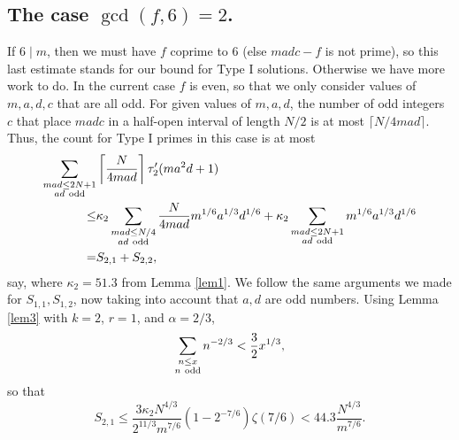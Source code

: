 \documentclass[12pt]{amsart}
\theoremstyle{definition}
\theoremstyle{remark}
\numberwithin{equation}{section}
\begin{document}
\subsection{The case $\gcd(f,6)=2$.}
If $6\mid m$, then we must have $f$ coprime to 6 (else $madc-f$ is not prime),
so this last estimate stands for our bound for Type I solutions.
Otherwise we have more work to do.  In the current case $f$ is even, so
that we only consider values of $m,a,d,c$ that are all odd.  For given values of $m,a,d$,
the number of odd integers $c$ that place $madc$ in a half-open interval of length $N/2$
is at most $\lceil N/4mad\rceil$.  Thus, the count for Type I primes in this case
is at most
\begin{align*}
\sum_{\substack{mad\le 2N+1\\ad~{\rm odd}}}&\left\lceil\frac{N}{4mad}\right\rceil\tau'_2(ma^2d+1)\\
\le&\kappa_2\sum_{\substack{mad\le N/4\\ad~{\rm odd}}}\frac N{4mad}m^{1/6}a^{1/3}d^{1/6}+\kappa_2\sum_{\substack{mad\le 2N+1\\ad~{\rm odd}}}m^{1/6}a^{1/3}d^{1/6}\\
=&S_{2,1}+S_{2,2},
\end{align*}
say, where $\kappa_2=51.3$ from Lemma \ref{lem1}.
We follow the same arguments we made for $S_{1,1},S_{1,2}$, now taking into account that
$a,d$ are odd numbers.  Using Lemma \ref{lem3} with $k=2$, $r=1$, and $\alpha=2/3$,
\[
\sum_{\substack{n\le x\\n~{\rm odd}}}n^{-2/3}<\frac32x^{1/3},
\]
so that
\[
S_{2,1}\le \frac{3\kappa_2N^{4/3}}{2^{11/3}m^{7/6}}(1-2^{-7/6})\zeta(7/6)
<44.3\frac{N^{4/3}}{m^{7/6}}.
\]
\end{document}
